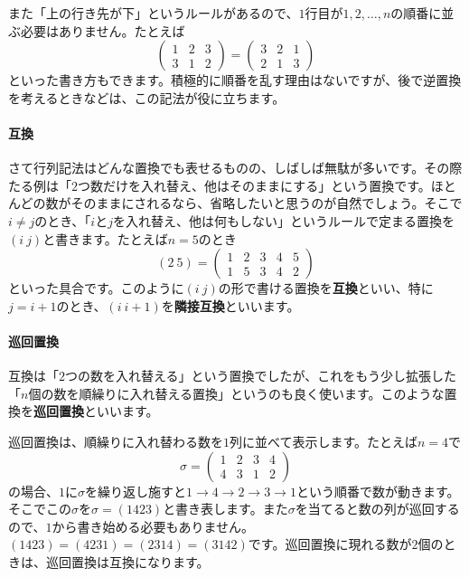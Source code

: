 また「上の行き先が下」というルールがあるので、$1$行目が$1, 2, \ldots, n$の順番に並ぶ必要はありません。たとえば
\[
\begin{pmatrix}
1 & 2 & 3 \\
3 & 1 & 2
\end{pmatrix}
=
\begin{pmatrix}
3 & 2 & 1 \\
2 & 1 & 3
\end{pmatrix}
\]
といった書き方もできます。積極的に順番を乱す理由はないですが、後で逆置換を考えるときなどは、この記法が役に立ちます。

\paragraph{互換}

さて行列記法はどんな置換でも表せるものの、しばしば無駄が多いです。その際たる例は「$2$つ数だけを入れ替え、他はそのままにする」という置換です。ほとんどの数がそのままにされるなら、省略したいと思うのが自然でしょう。そこで$i \neq j$のとき、「$i$と$j$を入れ替え、他は何もしない」というルールで定まる置換を$(i\ j)$と書きます。たとえば$n = 5$のとき
\[
(2\ 5) =
\begin{pmatrix}
1 & 2 & 3 & 4 & 5 \\
1 & 5 & 3 & 4 & 2
\end{pmatrix}
\]
といった具合です。このように$(i\ j)$の形で書ける置換を\textbf{互換}といい、特に$j = i + 1$のとき、$(i\ i+1)$を\textbf{隣接互換}といいます。

\paragraph{巡回置換} 互換は「$2$つの数を入れ替える」という置換でしたが、これをもう少し拡張した「$n$個の数を順繰りに入れ替える置換」というのも良く使います。このような置換を\textbf{巡回置換}といいます。

巡回置換は、順繰りに入れ替わる数を$1$列に並べて表示します。たとえば$n = 4$で
\[
\sigma =
\begin{pmatrix}
1 & 2 & 3 & 4 \\
4 & 3 & 1 & 2
\end{pmatrix}
\]
の場合、$1$に$\sigma$を繰り返し施すと$1 \rightarrow 4 \rightarrow 2 \rightarrow 3 \rightarrow 1$という順番で数が動きます。そこでこの$\sigma$を$\sigma = (1423)$と書き表します。また$\sigma$を当てると数の列が巡回するので、$1$から書き始める必要もありません。$(1423) = (4231) = (2314) = (3142)$です。巡回置換に現れる数が$2$個のときは、巡回置換は互換になります。

